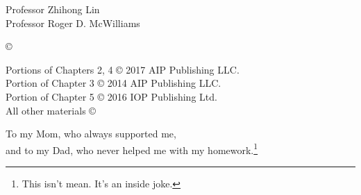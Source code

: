




\othercommitteemembers
{
  Professor Zhihong Lin\\
  Professor Roger D. McWilliams
}


\copyrightdeclaration
{
  {\copyright} {\Degreeyear} \Authorname
}

\prepublishedcopyrightdeclaration
{
	Portions of Chapters 2, 4 {\copyright} 2017 AIP Publishing LLC. \\
	Portion of Chapter 3 {\copyright} 2014 AIP Publishing LLC. \\
	Portion of Chapter 5 {\copyright} 2016 IOP Publishing Ltd. \\
	All other materials {\copyright} {\Degreeyear} \Authorname
}

\dedications
{
To my Mom, who always supported me, \\and to my Dad, who never helped me with my homework.\footnote{This isn't mean. It's an inside joke.}
}

